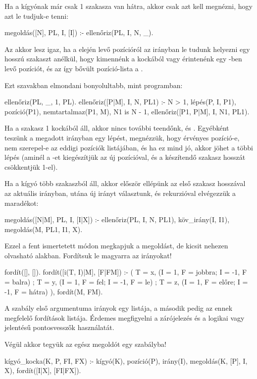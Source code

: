 Ha a kígyónak már csak 1 szakasza van hátra, akkor
csak azt kell megnézni, hogy azt le tudjuk-e tenni:
\begin{program}
megoldás([N], PL, I, [I]) :- ellenőriz(PL, I, N, _).
\end{program}
Az  akkor lesz igaz, ha
a  elején levő pozícióról az  irányban
le tudunk helyezni egy  hosszú szakaszt
anélkül, hogy kimennénk a kockából vagy érintenénk
egy -ben levő pozíciót, és az így bővült
pozíció-lista a .

Ezt szavakban elmondani bonyolultabb, mint
programban:
\begin{program}
ellenőriz(PL, _, 1, PL).
ellenőriz([P|M], I, N, PL1) :-
    N > 1, lépés(P, I, P1),
    pozíció(P1), nemtartalmaz(P1, M), N1 is N - 1,
    ellenőriz([P1, P|M], I, N1, PL1).
\end{program}
Ha a szakasz 1 kockából áll, akkor nincs további
teendőnk, és . Egyébként teszünk a
megadott irányban egy lépést, megnézzük, hogy
érvényes pozíció-e, nem szerepel-e az eddigi
pozíciók listájában, és ha ez mind jó, akkor jöhet a
többi lépés (aminél a -et kiegészítjük az új
 pozícióval, és a készítendő szakasz hosszát
csökkentjük 1-el).

Ha a kígyó több szakaszból áll, akkor először
ellépünk az első szakasz hosszával az aktuális
irányban, utána új irányt választunk, és rekurzióval
elvégezzük a maradékot:
\begin{program}
megoldás([N|M], PL, I, [I|X]) :-
    ellenőriz(PL, I, N, PL1), köv_irány(I, I1), 
    megoldás(M, PL1, I1, X).
\end{program}

Ezzel a fent ismertetett módon megkapjuk a
megoldást, de kicsit nehezen olvasható
alakban. Fordítsuk le magyarra az irányokat!
\begin{program}
fordít([], []).
fordít([i(T, I)|M], [F|FM]) :-
    (  T = x, (I = 1, F = jobbra; I = -1, F = balra)
     ; T = y, (I = 1, F = fel;    I = -1, F = le)
     ; T = z, (I = 1, F = előre;  I = -1, F = hátra)
    ), 
    fordít(M, FM).
\end{program}
A  szabály első argumentuma irányok egy
listája, a második pedig az ennek megfelelő
fordítások listája. Érdemes megfigyelni a
zárójelezés és a logikai vagy jelentésű
pontosvesszők használatát.

Végül akkor tegyük az egész megoldót egy szabályba!
\begin{program}
kígyó_kocka(K, P, FI, FX) :-
    kígyó(K), pozíció(P), irány(I),
    megoldás(K, [P], I, X), fordít([I|X], [FI|FX]).
\end{program}

